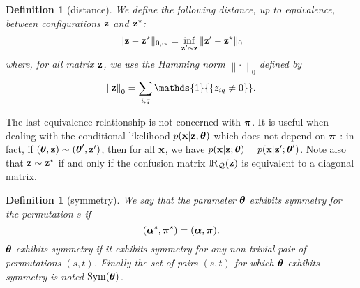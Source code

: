 \documentclass[]{imsart}
\newcommand{\1}{\mathds{1}}
\numberwithin{equation}{section}
\theoremstyle{plain}
\newtheorem{dof}[thm]{Definition}
\theoremstyle{remark}
\begin{document}
\begin{dof}[distance]
  \label{def:equivalence-distance}
  We define the following distance, up to equivalence, between configurations $\mathbf{z}$ and $\mathbf{z}^\star$:
    \begin{equation*}
    \|\bz - \bzs\|_{0, \sim} = \inf_{\bz' \sim \bz} \|\bz' - \bzs\|_0
    \end{equation*}
    where, for all matrix $\mathbf{z}$, we use the Hamming norm $\left\|\cdot\right\|_{0}$ defined by
\[\left\|\bz\right\|_{0}=\sum_{\ii,\kk}{\mathds{1}{\left\{\zik\neq0\right\}}}.\]
\end{dof}
  
  
The last equivalence relationship is not concerned with $\boldsymbol{\pi}$. It is useful when dealing with the conditional likelihood $p(\mathbf{x}| \mathbf{z}; \boldsymbol{\theta})$ which does not depend on $\boldsymbol{\pi}$ :  in fact, if $(\boldsymbol{\theta}, \mathbf{z}) \sim (\boldsymbol{\theta}', \mathbf{z}')$, then for all $\mathbf{x}$, we have $p(\mathbf{x}| \mathbf{z}; \boldsymbol{\theta}) = p(\mathbf{x}| \mathbf{z}'; \boldsymbol{\theta}')$. 
Note also that $\mathbf{z} \sim \mathbf{z}^\star$  if and only if the confusion matrix $\RQbz$  is equivalent to a diagonal matrix. 

\begin{dof}[symmetry]
  \label{def:symmetry}
  We say that the parameter $\boldsymbol{\theta}$ \emph{exhibits symmetry for the permutation} $s$ if
  \begin{equation*}
    (\bpi^s, \bal^{s}) = (\bpi, \bal).
  \end{equation*}
  $\boldsymbol{\theta}$ \emph{exhibits symmetry} if it exhibits symmetry for any non trivial pair of permutations $(s,t)$. Finally the set of pairs $(s,t)$ for which $\boldsymbol{\theta}$ exhibits symmetry is noted $\operatorname{Sym}(\boldsymbol{\theta})$.
\end{dof}

\end{document}
